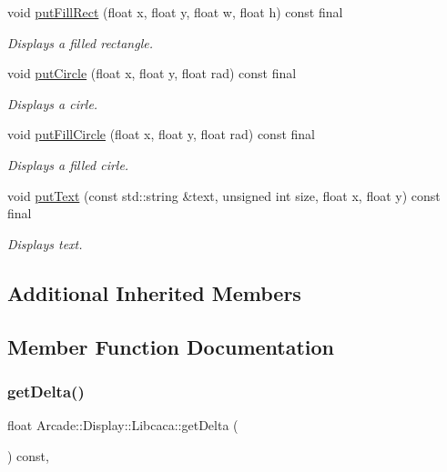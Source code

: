 \begin{DoxyCompactItemize}
void \mbox{\hyperlink{classArcade_1_1Display_1_1Libcaca_ae07479000ed6c518053cd593a4aba092}{put\+Fill\+Rect}} (float x, float y, float w, float h) const final
\begin{DoxyCompactList}\small\item\em Displays a filled rectangle. \end{DoxyCompactList}\item 
void \mbox{\hyperlink{classArcade_1_1Display_1_1Libcaca_a1a718ada53339b195c532fa52600e164}{put\+Circle}} (float x, float y, float rad) const final
\begin{DoxyCompactList}\small\item\em Displays a cirle. \end{DoxyCompactList}\item 
void \mbox{\hyperlink{classArcade_1_1Display_1_1Libcaca_aab9a63f5507cd00121c3b91c7ca15aa3}{put\+Fill\+Circle}} (float x, float y, float rad) const final
\begin{DoxyCompactList}\small\item\em Displays a filled cirle. \end{DoxyCompactList}\item 
void \mbox{\hyperlink{classArcade_1_1Display_1_1Libcaca_a2d4198dc8e383672ac00114d10b11e01}{put\+Text}} (const std\+::string \&text, unsigned int size, float x, float y) const final
\begin{DoxyCompactList}\small\item\em Displays text. \end{DoxyCompactList}\end{DoxyCompactItemize}
\subsection*{Additional Inherited Members}


\subsection{Member Function Documentation}
\mbox{\label{classArcade_1_1Display_1_1Libcaca_a6aee007c10e66709680d1ec80f2662a4}} 
\subsubsection{\texorpdfstring{getDelta()}{getDelta()}}
{\footnotesize\ttfamily float Arcade\+::\+Display\+::\+Libcaca\+::get\+Delta (\begin{DoxyParamCaption}{ }\end{DoxyParamCaption}) const\hspace{0.3cm}{\ttfamily [final]}, {\ttfamily [virtual]}}



